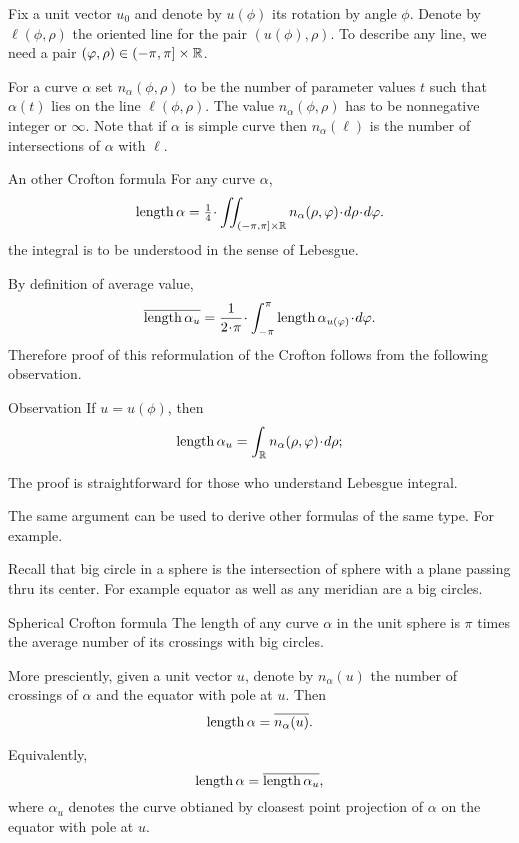 Fix a unit vector $u_0$ and denote by $u(\phi)$ its rotation by angle $\phi$.
Denote by $\ell(\phi,\rho)$ the oriented line for the pair $(u(\phi),\rho)$.
To describe any line, we need a pair $(\varphi,\rho)\in (-\pi,\pi]\times \mathbb{R}$.

For a curve $\alpha$  set $n_\alpha(\phi,\rho)$ to be the number of parameter values $t$ such that $\alpha(t)$ lies on the line $\ell(\phi,\rho)$. 
The value $n_\alpha(\phi,\rho)$ has to be nonnegative integer or $\infty$.
Note that if $\alpha$ is simple curve then $n_\alpha(\ell)$ is the number of intersections of $\alpha$ with $\ell$.


\begin{thm}{An other Crofton formula}
For any curve $\alpha$,
\[\length\alpha=\tfrac14\cdot\iint_{(-\pi,\pi]\times \RR} n_\alpha(\rho,\phi)\cdot d\rho\cdot d\phi.\]
the integral is to be understood in the sense of Lebesgue.
\end{thm}

By definition of average value,
\[\overline{\length\alpha_u}
=
\frac1{2\cdot\pi}\cdot\int_{-\pi}^\pi \length\alpha_{u(\phi)}\cdot d\phi.\]
Therefore  proof of this reformulation of the Crofton follows from the following observation.

\begin{thm}{Observation}
If $u=u(\phi)$, then 
\[\length\alpha_u=\int_\RR n_\alpha(\rho,\phi)\cdot d\rho;\]

\end{thm}

The proof is straightforward for those who understand Lebesgue integral.

The same argument can be used to derive other formulas of the same type.
For example.

Recall that big circle in a sphere is the intersection of sphere with a plane passing thru its center.
For example equator as well as any meridian are a big circles.

\begin{thm}{Spherical Crofton formula}
The length of any curve $\alpha$ in the unit sphere is $\pi$ times the average number of its crossings with big circles.

More presciently, given a unit vector $u$, denote by $n_\alpha(u)$ the number of crossings of $\alpha$ and the equator with pole at $u$.
Then 
\[\mathop{\rm length}\nolimits\alpha=\overline{n_\alpha(u)}.\]

Equivalently,
\[\mathop{\rm length}\nolimits\alpha=\overline{\mathop{\rm length}\nolimits\alpha_u},\]
where $\alpha_u$ denotes the curve obtianed by cloasest point projection of $\alpha$ on the equator with pole at $u$.
\end{thm}



